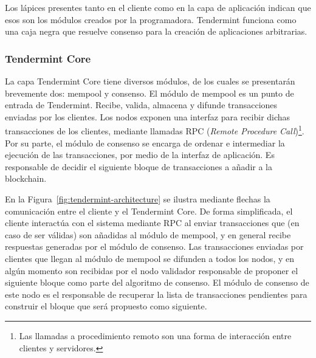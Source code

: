 Los lápices presentes tanto en el cliente como en la capa de aplicación indican que esos son los módulos creados
por la programadora.
%
Tendermint funciona como una caja negra que resuelve consenso para la creación de aplicaciones arbitrarias.
%

\subsubsection{Tendermint Core}

La capa Tendermint Core tiene diversos módulos, de los cuales se presentarán brevemente dos: mempool y consenso.
%
El módulo de mempool es un punto de entrada de Tendermint.
%
Recibe, valida, almacena y difunde transacciones enviadas por los clientes. 
%
%
Los nodos exponen una interfaz para recibir dichas transacciones de los clientes, mediante llamadas
RPC (\textit{Remote Procedure Call})\footnote{Las llamadas a procedimiento remoto son una forma de
interacción entre clientes y servidores.}.
%
%
%
Por su parte, el módulo de consenso se encarga de ordenar e intermediar la ejecución de las transacciones, por medio de la
interfaz de aplicación. Es responsable de decidir el siguiente bloque de transacciones a añadir a la blockchain.

En la Figura~\ref{fig:tendermint-architecture} se ilustra mediante flechas la comunicación
entre el cliente y el Tendermint Core.
De forma simplificada, el cliente interactúa con el sistema mediante RPC al enviar transacciones
que (en caso de ser válidas) son añadidas al módulo de mempool,
y en general recibe respuestas generadas por el módulo de consenso.
Las transacciones enviadas por clientes que llegan al módulo de mempool se difunden a todos los nodos,
y en algún momento son recibidas
por el nodo validador responsable de proponer el siguiente bloque como parte del algoritmo de consenso.
El módulo de consenso de este nodo es el responsable de recuperar la lista de transacciones pendientes
para construir el bloque que será propuesto como siguiente. 


